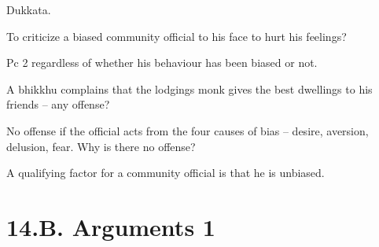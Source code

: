 \begin{solution}
  Dukkata.
\end{solution}

\bigskip

To criticize a biased community official to his face to hurt his feelings?

\begin{solution}
  Pc 2 regardless of whether his behaviour has been biased or not.
\end{solution}

\bigskip

A bhikkhu complains that the lodgings monk gives the best dwellings to his friends – any offense?

\begin{solution}
  No offense if the official acts from the four causes of bias – desire, aversion,
  delusion, fear. Why is there no offense?

  A qualifying factor for a community official is that he is unbiased.
\end{solution}

\chapter{14.B. Arguments 1}
\renewcommand*{\theChapterTitle}{14.B. Arguments 1}
